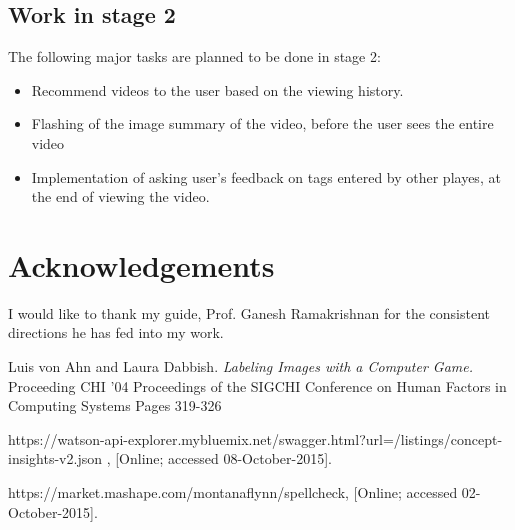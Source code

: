 \documentclass[12pt]{article}
\begin{document}
\subsection{Work in stage 2}
The following major tasks are planned to be done in stage 2:
\begin{itemize}
\item Recommend videos to the user based on the viewing history.
	\item Flashing of the image summary of the video, before the user sees the entire video
	\item Implementation of asking user's feedback on tags entered by other playes, at the end of viewing the video.
	
	
\end{itemize}








\newpage
\section*{Acknowledgements}
I would like to thank my guide, Prof. Ganesh Ramakrishnan for the consistent directions he has fed into my work.

\newpage
\pagestyle{empty}

\nocite{*}
%



\begin{thebibliography}{9}
  Luis von Ahn and Laura Dabbish.
    \textit{ Labeling Images with a Computer Game.}
Proceeding
CHI '04 Proceedings of the SIGCHI Conference on Human Factors in Computing Systems
Pages 319-326 



https://watson-api-explorer.mybluemix.net/swagger.html?url=/listings/concept-insights-v2.json , [Online; accessed 08-October-2015].


https://market.mashape.com/montanaflynn/spellcheck,      [Online; accessed 02-October-2015].

  
\end{thebibliography}
 
\end{document}
